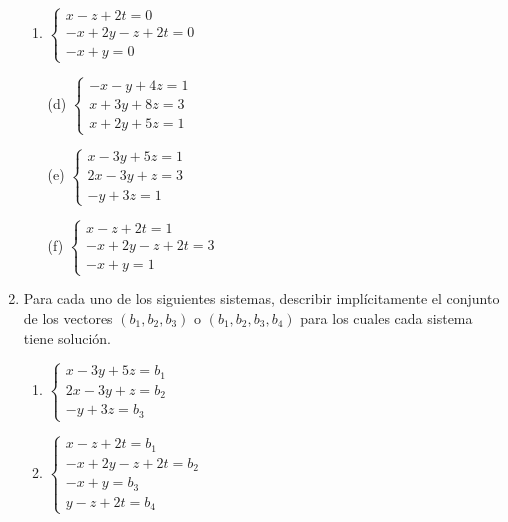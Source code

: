 \begin{enumerate}[topsep=6pt, itemsep=.4cm]
\begin{multicols}{2}
\begin{enumerate}
\item $\begin{cases}
x-z+2t = 0\\
-x+2y-z+2t = 0\\
-x+y = 0
\end{cases}$

\item[(d)] $\begin{cases}
 -x - y + 4z = 1\\
 x+3y+8z = 3\\
 x+2y + 5z = 1
\end{cases}$

\item[(e)] $\begin{cases}
 x - 3y + 5z = 1\\
 2x-3y+z = 3\\
 -y + 3z = 1
\end{cases}$


\item[(f)] $\begin{cases}
x-z+2t = 1\\
-x+2y-z+2t = 3\\
-x+y = 1
\end{cases}$

\end{enumerate}
\end{multicols}



\item\label{sistemas con soluciones} Para cada uno de los siguientes sistemas, describir implícitamente el conjunto de los vectores $(b_1,b_2,b_3)$
o $(b_1,b_2,b_3,b_4)$ para los cuales cada sistema tiene solución.
\begin{multicols}{2}
\begin{enumerate}

\item $\begin{cases}
 x - 3y + 5z = b_1\\
 2x-3y+z = b_2\\
 -y + 3z = b_3
\end{cases}$


\item
$\begin{cases}
x-z+2t = b_1\\
-x+2y-z+2t = b_2\\
-x+y = b_3\\
y-z+2t=b_4
\end{cases}$



\end{enumerate}
\end{multicols}
\end{enumerate}
